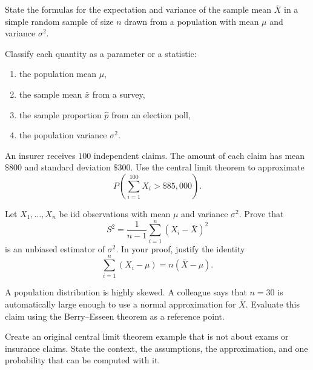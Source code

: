 \begin{problema}\label{prob:22013b6}
State the formulas for the expectation and variance of the sample mean $\bar X$ in a simple random sample of size $n$ drawn from a population with mean $\mu$ and variance $\sigma^2$.
\end{problema}

\begin{problema}\label{prob:f4e7b8b}
Classify each quantity as a parameter or a statistic:
\begin{enumerate}[label=(\alph*)]
	\item the population mean $\mu$,
	\item the sample mean $\bar x$ from a survey,
	\item the sample proportion $\hat p$ from an election poll,
	\item the population variance $\sigma^2$.
\end{enumerate}
\end{problema}

\begin{problema}\label{prob:6815de7}
An insurer receives $100$ independent claims. The amount of each claim has mean $\$800$ and standard deviation $\$300$. Use the central limit theorem to approximate
\[
	P\left(\sum_{i=1}^{100} X_i > \$85{,}000\right).
\]
\end{problema}

\begin{problema}\label{prob:716e9bb}
Let $X_1,\ldots,X_n$ be iid observations with mean $\mu$ and variance $\sigma^2$. Prove that
\[
	S^2=\frac{1}{n-1}\sum_{i=1}^n (X_i-\bar X)^2
\]
is an unbiased estimator of $\sigma^2$. In your proof, justify the identity
\[
	\sum_{i=1}^n (X_i-\mu)=n(\bar X-\mu).
\]
\end{problema}

\begin{problema}\label{prob:0555e27}
A population distribution is highly skewed. A colleague says that $n=30$ is automatically large enough to use a normal approximation for $\bar X$. Evaluate this claim using the Berry--Esseen theorem as a reference point.
\end{problema}

\begin{problema}\label{prob:2e2f544}
Create an original central limit theorem example that is not about exams or insurance claims. State the context, the assumptions, the approximation, and one probability that can be computed with it.
\end{problema}

